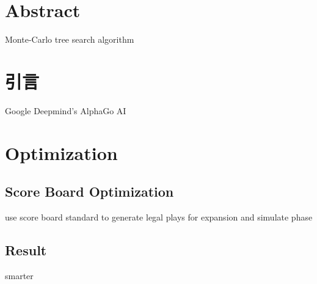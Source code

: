 \section*{Abstract}
Monte-Carlo tree search algorithm\cite{DBLP:conf/ecml/KocsisS06}\cite{DBLP:conf/aiide/ChaslotBSS08}
\newpage


\tableofcontents
\newpage

\null\thispagestyle{empty}
\newpage


\section{引言}
Google Deepmind's AlphaGo AI\cite{DBLP:journals/nature/SilverHMGSDSAPL16}\cite{silver2017mastering}
\newpage

\section{Optimization}
\subsection{Score Board Optimization}
use score board standard to generate legal plays for expansion and simulate phase
\subsection{Result}
smarter
\newpage



\newpage


